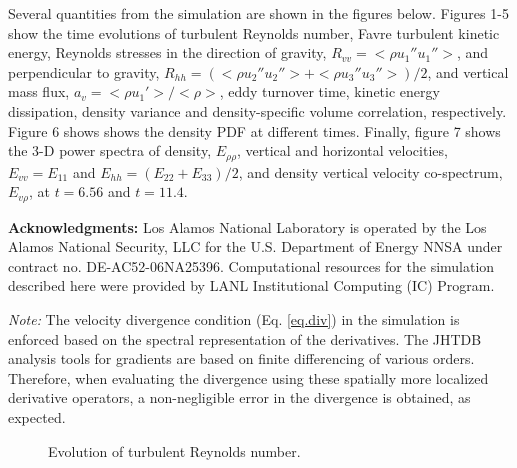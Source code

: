 \documentclass[11pt]{article}
\begin{document}
Several quantities from the simulation are shown in the figures below. Figures
1-5 show the time evolutions of turbulent Reynolds number, Favre turbulent 
kinetic energy, Reynolds stresses in the direction of gravity, 
$R_{vv}= <\rho u_1'' u_1''>$, and perpendicular to gravity, 
$R_{hh}= (<\rho u_2'' u_2''>+<\rho u_3'' u_3''>)/2$, and vertical mass 
flux, $a_v = <\rho u_1'>/<\rho>$, eddy turnover time, kinetic energy 
dissipation, density variance and density-specific volume correlation, 
respectively. Figure 6 shows shows the density PDF at different times. Finally,
figure 7 shows the 3-D power spectra of density, $E_{\rho\rho}$, vertical and 
horizontal velocities, $E_{vv}= E_{11}$ and $E_{hh}= (E_{22}+E_{33})/2$, and 
density vertical velocity co-spectrum, $E_{v\rho}$, at $t=6.56$ and $t=11.4$. 

\vskip 0.2in

{\bf Acknowledgments:} Los Alamos National Laboratory is operated by the Los 
Alamos National Security, LLC for the U.S. Department of Energy NNSA under 
contract no. DE-AC52-06NA25396. Computational resources for the simulation
described here were provided by LANL Institutional Computing (IC) Program.




\vskip 0.2in

{\em * Note:}
The velocity divergence condition (Eq. \ref{eq.div}) in the simulation is 
enforced based on the spectral representation of the derivatives. The JHTDB 
analysis tools for gradients are based on finite differencing of various 
orders. Therefore, when evaluating the divergence using these spatially more 
localized derivative operators, a non-negligible error in the divergence is 
obtained, as expected.

\vskip 2in

\center

\begin{figure}[h]
\caption{Evolution of turbulent Reynolds number.}
\label{figure1}
\end{figure}
\end{document}
